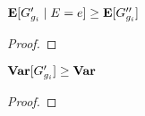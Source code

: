 \begin{lemma}{$\operatorname*{\mathbf{E}}[G'_{g_i} \mid E = e] \geq \operatorname*{\mathbf{E}}[G''_{g_i}]$}
\begin{proof}
\end{proof}	
\end{lemma}

\begin{lemma}{$\operatorname*{\mathbf{Var}}[G'_{g_i}] \geq \operatorname*{\mathbf{Var}}$}
\begin{proof}
\end{proof}	
\end{lemma}







